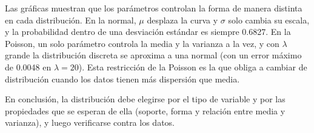 \documentclass[11pt,letterpaper]{article}
\begin{document}
Las gráficas muestran que los parámetros controlan la forma de manera distinta en cada distribución. En la normal, $\mu$ desplaza la curva y $\sigma$ solo cambia su escala, y la probabilidad dentro de una desviación estándar es siempre 0.6827. En la Poisson, un solo parámetro controla la media y la varianza a la vez, y con $\lambda$ grande la distribución discreta se aproxima a una normal (con un error máximo de 0.0048 en $\lambda = 20$). Esta restricción de la Poisson es la que obliga a cambiar de distribución cuando los datos tienen más dispersión que media.

En conclusión, la distribución debe elegirse por el tipo de variable y por las propiedades que se esperan de ella (soporte, forma y relación entre media y varianza), y luego verificarse contra los datos.

\end{document}
